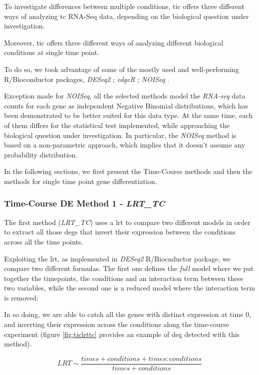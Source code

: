 To investigate differences between multiple conditions, \gls{tic} offers three different ways of analyzing \gls{tc} RNA-Seq data, depending on the biological question under investigation.

Moreover, \gls{tic} offers three different ways of analyzing different biological conditions at single time point.

To do so, we took advantage of some of the mostly used and well-performing \cite{Costa-Silva2017} R/Bioconductor packages, \textit{DESeq2} \cite{Love2014}; \textit{edgeR} \cite{Robinson2009}; \textit{NOISeq} \cite{Tarazona2011, Tarazona2015}.

Exception made for \textit{NOISeq}, all the selected methods model the \textit{RNA-seq} data counts for each gene as independent Negative Binomial distributions, which has been demonstrated \cite{Robinson2007} to be better suited for this data type.
At the same time, each of them differs for the statistical test implemented, while approaching the biological question under investigation.
In particular, the \textit{NOISeq} method is based on a non-parametric approach, which implies that it doesn't assume any probability distribution.

In the following sections, we first present the Time-Course methods and then the methods for single time point gene differentiation.

\subsubsection{Time-Course DE Method 1 - \textit{LRT\_TC}}
The first method (\textit{LRT\_TC}) uses a \gls{lrt} to compare two different models in order to extract all those \glspl{deg} that invert their expression between the conditions across all the time points.

Exploiting the \gls{lrt}, as implemented in \textit{DESeq2} R/Biocnductor package, we compare two different formulas.
The first one defines the \textit{full} model where we put together the timepoints, the conditions and an interaction term between these two variables, while the second one is a reduced model where the interaction term is removed:

In so doing, we are able to catch all the genes with distinct expression at time 0, and inverting their expression across the conditions along the time-course experiment (figure \ref{fig:ticlrttc} provides an example of \gls{deg} detected with this method). 

\[LRT \sim \frac{times+conditions+times:conditions}{times+conditions}\]

